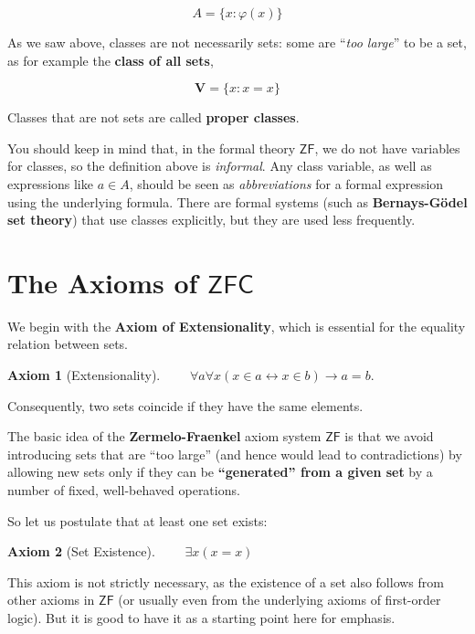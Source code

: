 \documentclass{article}
\newcommand{\ZF}{\mathsf{ZF}}
\newtheorem{axiom}{Axiom}[section]
\begin{document}
\begin{equation}
A = \{x \colon \varphi(x)\}
\end{equation}

As we saw above, classes are not necessarily sets: some are ``\textit{too large}'' to be a set, as for example the \textbf{class of all sets},

\begin{equation}
\mathbf{V} = \{ x \colon x = x \}
\end{equation}

Classes that are not sets are called \textbf{proper classes}.

You should keep in mind that, in the formal theory $\ZF$, we do not have variables for classes, so the definition above is \textit{informal}.  Any class variable, as well as expressions like $a \in A$, should be seen as \textit{abbreviations} for a formal expression using the underlying formula.
There are formal systems (such as \textbf{Bernays-Gödel set theory}) that use classes explicitly, but they are used less frequently.

\section{The Axioms of $\mathsf{ZFC}$}

We begin with the \textbf{Axiom of Extensionality}, which is essential for the equality relation between sets.

\begin{axiom}[Extensionality]$\qquad \forall a \forall x (x \in a  \leftrightarrow x \in b)  \to a=b.$

\end{axiom}Consequently, two sets coincide if they have the same elements.

The basic idea of the \textbf{Zermelo-Fraenkel} axiom system $\ZF$ is that we avoid introducing sets that are ``too large'' (and hence would lead to contradictions) by allowing new sets only if they can be \textbf{``generated'' from a given set} by a number of fixed, well-behaved operations.

So let us postulate that at least one set exists:

\begin{axiom}[Set Existence]$\qquad \exists x ( x = x )$

\end{axiom}This axiom is not strictly necessary, as the existence of a set also follows from other axioms in $\ZF$ (or usually even from the underlying axioms of first-order logic). But it is good to have it as a starting point here for emphasis.
\end{document}
